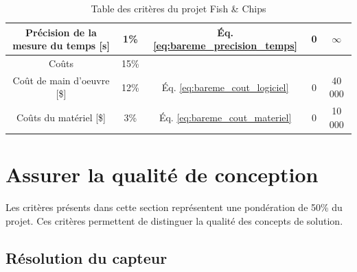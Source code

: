 \begin{table}[htp]
{\begin{tabular}{|c|c|c|c|c|}
        Précision de la mesure du temps [s] & 1\% & Éq. \ref{eq:bareme_precision_temps} & 0 & $\infty$\\
        \hline\hline
        Coûts & 15\% & & &\\
        \hline
        Coût de main d'oeuvre [\$] & 12\% & Éq. \ref{eq:bareme_cout_logiciel} & 0 & 40 000\\
        Coûts du matériel [\$] & 3\% & Éq. \ref{eq:bareme_cout_materiel} & 0 & 10 000 \\
        \hline
   \end{tabular}}
    \caption{Table des critères du projet Fish \& Chips}
    \label{t:criteres}
\end{table}



\newpage{}

\section{Assurer la qualité de conception}
\label{Asssqualite}
Les critères présents dans cette section représentent une pondération de 50\% du projet. Ces critères permettent de distinguer la qualité des concepts de solution.  

\subsection{Résolution du capteur}
\label{Rdc}


